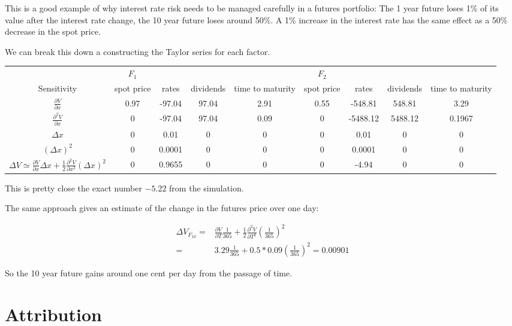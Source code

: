 \documentclass{tran-l}
\theoremstyle{definition}
\theoremstyle{remark}
\numberwithin{equation}{subsection}
\begin{document}
This is a good example of why interest rate risk needs to be managed carefully in a futures portfolio: The 1 year future loses 1\% of its value after the interest rate change, the 10 year future loses around 50\%. A 1\% increase in the interest rate has the same effect as a 50\% decrease in the spot price. 

We can break this down a constructing the Taylor series for each factor.

\begin{tiny}
\begin{tabular}{|c|cccc|cccc|}
\hline
 & $F_1$ & &  & &$F_2$ &  & &\\
 Sensitivity & spot price & rates & dividends& time to maturity & spot price & rates & dividends & time to maturity\\
 \hline
 $\frac{\partial V}{\partial x}$ & 0.97  & -97.04 & 97.04  & 2.91 & 0.55 & -548.81 & 548.81 & 3.29 \\
 $\frac{\partial^2 V}{\partial x}$& 0 & -97.04& 97.04 & 0.09 & 0 & -5488.12 & 5488.12 & 0.1967 \\
 $\Delta x$ & 0 & 0.01 & 0 & 0 & 0 & 0.01 & 0 & 0 \\
 $(\Delta x)^2$  & 0 & 0.0001 & 0 & 0 & 0 & 0.0001 & 0 & 0\\
 $\Delta V \simeq \frac{\partial V}{\partial x}\Delta x + \frac{1}{2} \frac{\partial^2 V}{\partial x^2}(\Delta x)^2$ & 0& 0.9655 &  0 & 0 & 0 & -4.94 & 0 & 0  \\
 \hline
 \end{tabular}
 \end{tiny}
 
 This is pretty close the exact number $-5.22$ from the simulation.
 
 The same approach gives an estimate of the change in the futures price over one day:
 
\begin{eqnarray*}
\Delta V_{F_{10}} =& \frac{\partial V}{\partial T}  \frac{1}{365}  + \frac{1}{2}\frac{\partial^2 V}{\partial T^2}  \left(\frac{1}{365}\right)^2  \\
 =& 3.29\frac{1}{365} + 0.5 *0.09 \left( \frac{1}{365} \right)^2 = 0.00901
\end{eqnarray*}
 
 So the 10 year future gains around one cent per day from the passage of time.

\section{Attribution}
\end{document}
